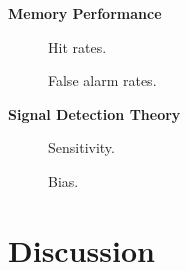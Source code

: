 \documentclass[twocolumn]{svjour3}          %
\begin{document}
\noindent\textbf{Memory Performance }

\begin{figure}
  \caption{Hit rates.}
  \label{fig:hits}
\end{figure}

\begin{figure}
  \caption{False alarm rates.}
  \label{fig:fas}
\end{figure}

\noindent\textbf{Signal Detection Theory }


\begin{figure}
  \caption{Sensitivity.}
  \label{fig:sensitivity}
\end{figure}

\begin{figure}
  \caption{Bias.}
  \label{fig:learning}
\end{figure}

\section*{Discussion}
\label{discussion}

\begin{acknowledgements}
\end{acknowledgements}

 
\end{document}
